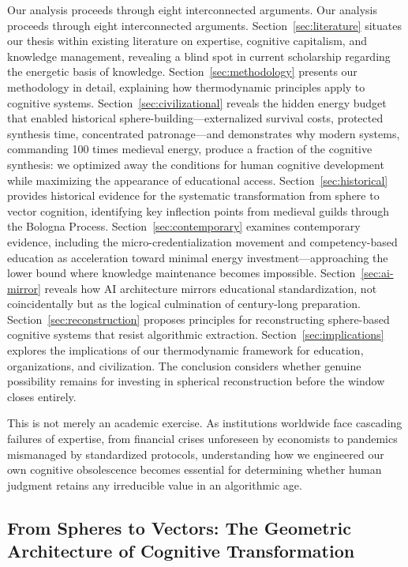 Our analysis proceeds through eight interconnected arguments. Our analysis proceeds through eight interconnected arguments. Section~\ref{sec:literature} situates our thesis within existing literature on expertise, cognitive capitalism, and knowledge management, revealing a blind spot in current scholarship regarding the energetic basis of knowledge. Section~\ref{sec:methodology} presents our methodology in detail, explaining how thermodynamic principles apply to cognitive systems. Section~\ref{sec:civilizational} reveals the hidden energy budget that enabled historical sphere-building---externalized survival costs, protected synthesis time, concentrated patronage---and demonstrates why modern systems, commanding 100 times medieval energy, produce a fraction of the cognitive synthesis: we optimized away the conditions for human cognitive development while maximizing the appearance of educational access. Section~\ref{sec:historical} provides historical evidence for the systematic transformation from sphere to vector cognition, identifying key inflection points from medieval guilds through the Bologna Process. Section~\ref{sec:contemporary} examines contemporary evidence, including the micro-credentialization movement and competency-based education as acceleration toward minimal energy investment—approaching the lower bound where knowledge maintenance becomes impossible. Section~\ref{sec:ai-mirror} reveals how AI architecture mirrors educational standardization, not coincidentally but as the logical culmination of century-long preparation. Section~\ref{sec:reconstruction} proposes principles for reconstructing sphere-based cognitive systems that resist algorithmic extraction. Section~\ref{sec:implications} explores the implications of our thermodynamic framework for education, organizations, and civilization. The conclusion considers whether genuine possibility remains for investing in spherical reconstruction before the window closes entirely.

This is not merely an academic exercise. As institutions worldwide face cascading failures of expertise, from financial crises unforeseen by economists to pandemics mismanaged by standardized protocols, understanding how we engineered our own cognitive obsolescence becomes essential for determining whether human judgment retains any irreducible value in an algorithmic age.

\subsection{From Spheres to Vectors: The Geometric Architecture of Cognitive Transformation}

